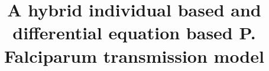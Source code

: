 \documentclass{bmcart}
\begin{document}
\begin{frontmatter}

\begin{fmbox}


\title{A hybrid individual based and differential equation based P. Falciparum transmission model}


\author[
   addressref={aff1},                   %
   corref={aff1},                       %
   noteref={n1},                        %
   email={giovanni.charles10@imperial.ac.uk}   %
]{ }

\author[
   addressref={aff1,aff2},
   email={john.RS.Smith@cambridge.co.uk}
]{ }


\address[id=aff1]{%
  , %
  ,                     %
  ,                              %
}
\address[id=aff2]{%
  ,
  ,
  ,
}


\end{fmbox}
\end{frontmatter}
\end{document}
